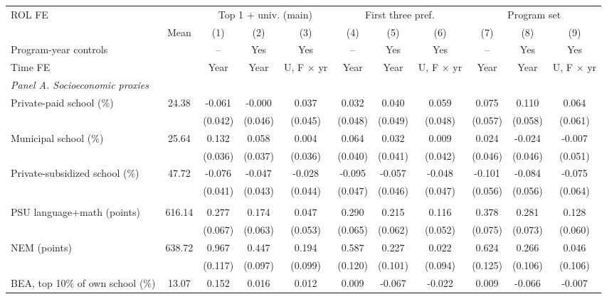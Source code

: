 \begin{tabular}{lc*{9}{c}}
\toprule
ROL FE & & \multicolumn{3}{c}{Top 1 + univ. (main)} & \multicolumn{3}{c}{First three pref.} & \multicolumn{3}{c}{Program set} \\
\cmidrule(lr){3-5}\cmidrule(lr){6-8}\cmidrule(lr){9-11}
 & Mean & (1) & (2) & (3) & (4) & (5) & (6) & (7) & (8) & (9) \\
Program-year controls &  & -- & Yes & Yes & -- & Yes & Yes & -- & Yes & Yes \\
Time FE &  & Year & Year & U, F \(\times\) yr & Year & Year & U, F \(\times\) yr & Year & Year & U, F \(\times\) yr \\
\midrule
\multicolumn{11}{l}{\textit{Panel A. Socioeconomic proxies}} \\
Private-paid school (\%) &  24.38 & -0.061 & -0.000 &  0.037 &  0.032 &  0.040 &  0.059 &  0.075 &  0.110\sym{*} &  0.064 \\
 &  & (0.042) & (0.046) & (0.045) & (0.048) & (0.049) & (0.048) & (0.057) & (0.058) & (0.061) \\
Municipal school (\%) &  25.64 &  0.132\sym{***} &  0.058 &  0.004 &  0.064 &  0.032 &  0.009 &  0.024 & -0.024 & -0.007 \\
 &  & (0.036) & (0.037) & (0.036) & (0.040) & (0.041) & (0.042) & (0.046) & (0.046) & (0.051) \\
Private-subsidized school (\%) &  47.72 & -0.076\sym{*} & -0.047 & -0.028 & -0.095\sym{**} & -0.057 & -0.048 & -0.101\sym{*} & -0.084 & -0.075 \\
 &  & (0.041) & (0.043) & (0.044) & (0.047) & (0.046) & (0.047) & (0.056) & (0.056) & (0.064) \\
\addlinespace
\multicolumn{11}{l}{\textit{Panel B. Achievement and other predetermined}} \\
PSU language+math (points) & 616.14 &  0.277\sym{***} &  0.174\sym{***} &  0.047 &  0.290\sym{***} &  0.215\sym{***} &  0.116\sym{**} &  0.378\sym{***} &  0.281\sym{***} &  0.128\sym{**} \\
 &  & (0.067) & (0.063) & (0.053) & (0.065) & (0.062) & (0.052) & (0.075) & (0.073) & (0.060) \\
NEM (points) & 638.72 &  0.967\sym{***} &  0.447\sym{***} &  0.194\sym{*} &  0.587\sym{***} &  0.227\sym{**} &  0.022 &  0.624\sym{***} &  0.266\sym{**} &  0.046 \\
 &  & (0.117) & (0.097) & (0.099) & (0.120) & (0.101) & (0.094) & (0.125) & (0.106) & (0.106) \\
BEA, top 10\% of own school (\%) &  13.07 &  0.152\sym{***} &  0.016 &  0.012 &  0.009 & -0.067 & -0.022 &  0.009 & -0.066 & -0.007 \\

\end{tabular}
